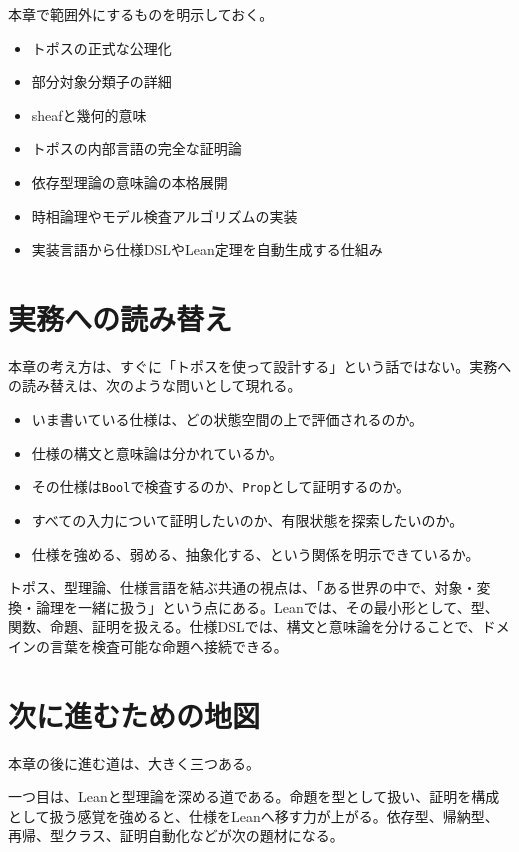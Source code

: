 本章で範囲外にするものを明示しておく。

\begin{itemize}
  \item トポスの正式な公理化
  \item 部分対象分類子の詳細
  \item sheafと幾何的意味
  \item トポスの内部言語の完全な証明論
  \item 依存型理論の意味論の本格展開
  \item 時相論理やモデル検査アルゴリズムの実装
  \item 実装言語から仕様DSLやLean定理を自動生成する仕組み
\end{itemize}

\section{実務への読み替え}

本章の考え方は、すぐに「トポスを使って設計する」という話ではない。実務への読み替えは、次のような問いとして現れる。

\begin{itemize}
  \item いま書いている仕様は、どの状態空間の上で評価されるのか。
  \item 仕様の構文と意味論は分かれているか。
  \item その仕様は\texttt{Bool}で検査するのか、\texttt{Prop}として証明するのか。
  \item すべての入力について証明したいのか、有限状態を探索したいのか。
  \item 仕様を強める、弱める、抽象化する、という関係を明示できているか。
\end{itemize}

トポス、型理論、仕様言語を結ぶ共通の視点は、「ある世界の中で、対象・変換・論理を一緒に扱う」という点にある。Leanでは、その最小形として、型、関数、命題、証明を扱える。仕様DSLでは、構文と意味論を分けることで、ドメインの言葉を検査可能な命題へ接続できる。

\section{次に進むための地図}

本章の後に進む道は、大きく三つある。

一つ目は、Leanと型理論を深める道である。命題を型として扱い、証明を構成として扱う感覚を強めると、仕様をLeanへ移す力が上がる。依存型、帰納型、再帰、型クラス、証明自動化などが次の題材になる。

